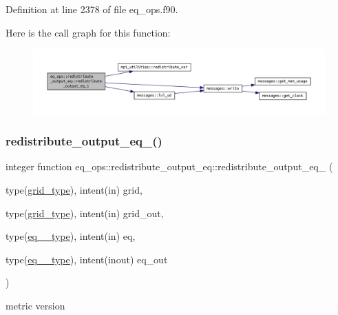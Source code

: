 Definition at line 2378 of file eq\+\_\+ops.\+f90.

Here is the call graph for this function\+:\nopagebreak
\begin{figure}[H]
\begin{center}
\leavevmode
\includegraphics[width=350pt]{interfaceeq__ops_1_1redistribute__output__eq_ac77911cf8c4631896ad2d0fff66e6893_cgraph}
\end{center}
\end{figure}
\mbox{\label{interfaceeq__ops_1_1redistribute__output__eq_afdbe3be15436f6abd965bd301ffd819d}} 
\subsubsection{\texorpdfstring{redistribute\+\_\+output\+\_\+eq\+\_()}{redistribute\_output\_eq\_2()}}
{\footnotesize\ttfamily integer function eq\+\_\+ops\+::redistribute\+\_\+output\+\_\+eq\+::redistribute\+\_\+output\+\_\+eq\+\_ (\begin{DoxyParamCaption}\item[{type(\hyperlink{structgrid__vars_1_1grid__type}{grid\+\_\+type}), intent(in)}]{grid,  }\item[{type(\hyperlink{structgrid__vars_1_1grid__type}{grid\+\_\+type}), intent(in)}]{grid\+\_\+out,  }\item[{type(\hyperlink{structeq__vars_1_1eq__2__type}{eq\+\_\+2\+\_\+type}), intent(in)}]{eq,  }\item[{type(\hyperlink{structeq__vars_1_1eq__2__type}{eq\+\_\+2\+\_\+type}), intent(inout)}]{eq\+\_\+out }\end{DoxyParamCaption})}



metric version 


